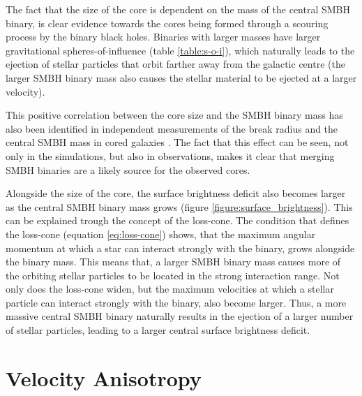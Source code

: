 \documentclass[english, twoside]{HYgradu}
\begin{document}
The fact that the size of the core is dependent on the mass of the central SMBH binary, is clear evidence towards the cores being formed through a scouring process by the binary black holes. Binaries with larger masses have larger gravitational spheres-of-influence (table \ref{table:s-o-i}), which naturally leads to the ejection of stellar particles that orbit farther away from the galactic centre (the larger SMBH binary mass also causes the stellar material to be ejected at a larger velocity). 

This positive correlation between the core size and the SMBH binary mass has also been identified in independent measurements of the break radius and the central SMBH mass in cored galaxies \citep[e.g.][]{deRuiter2005, Lauer2007Cusp, Thomas2016}. The fact that this effect can be seen, not only in the simulations, but also in observations, makes it clear that merging SMBH binaries are a likely source for the observed cores.

Alongside the size of the core, the surface brightness deficit also becomes larger as the central SMBH binary mass grows (figure \ref{figure:surface_brightness}). This can be explained trough the concept of the loss-cone. The condition that defines the loss-cone (equation \ref{eq:loss-cone}) shows, that the maximum angular momentum at which a star can interact strongly with the binary, grows alongside the binary mass. This means that, a larger SMBH binary mass causes more of the orbiting stellar particles to be located in the strong interaction range. Not only does the loss-cone widen, but the maximum velocities at which a stellar particle can interact strongly with the binary, also become larger. Thus, a more massive central SMBH binary naturally results in the ejection of a larger number of stellar particles, leading to a larger central surface brightness deficit.  

\section{Velocity Anisotropy}

\end{document}
